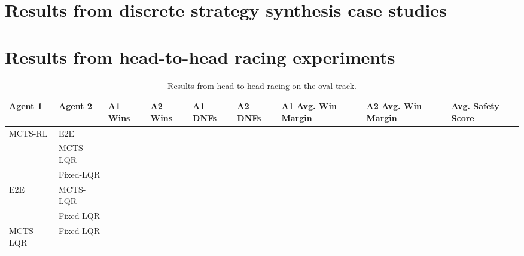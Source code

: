 \renewcommand{\thechapter}{A}
\section{Results from discrete strategy synthesis case studies}
\label{app:disc_results}

\section{Results from head-to-head racing experiments} \label{app:hier_results}
\begin{table} [H]
\centering
\begin{tabular}{@{}lllllllll@{}} 
\toprule
Agent 1  & Agent 2   & A1 Wins & A2 Wins & A1 DNFs & A2 DNFs & A1 Avg. Win Margin & A2 Avg. Win Margin & Avg. Safety Score\\ \midrule
MCTS-RL  & E2E       &         &         &         &         &                  &   &               \\
         & MCTS-LQR  &         &         &         &         &                  &   &               \\
         & Fixed-LQR &         &         &         &         &                  &   &               \\
E2E      & MCTS-LQR  &         &         &         &         &                  &    &              \\
         & Fixed-LQR &         &         &         &         &                  &   &               \\
MCTS-LQR & Fixed-LQR &         &         &         &         &                  &    &              \\ \bottomrule
\end{tabular}
\vspace{1 mm}
\caption{Results from head-to-head racing on the oval track.}
 \label{tab:results_oval}
\end{table}

